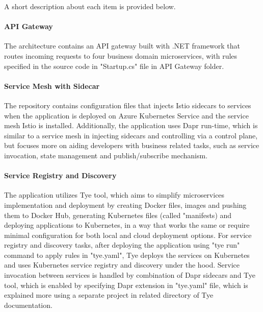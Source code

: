 \documentclass{Configuration_Files/PoliMi3i_thesis}
\begin{document}
A short description about each item is provided below.

\paragraph{API Gateway} The architecture contains an API gateway built with .NET framework that routes incoming requests to four business domain microservices, with rules specified in the source code in "Startup.cs" file in API Gateway folder.

\paragraph{Service Mesh with Sidecar} The repository contains configuration files that injects Istio sidecars to services when the application is deployed on Azure Kubernetes Service and the service mesh Istio is installed.
Additionally, the application uses Dapr run-time, which is similar to a service mesh in injecting sidecars and controlling via a control plane, but focuses more on aiding developers with business related tasks, such as service invocation, state management and publish/subscribe mechanism\footnotemark[97].

\paragraph{Service Registry and Discovery} The application utilizes Tye tool, which aims to simplify microservices implementation and deployment by creating Docker files, images and pushing them to Docker Hub, generating Kubernetes files (called "manifests) and deploying applications to Kubernetes, in a way that works the same or require minimal configuration for both local and cloud deployment options\footnotemark[98].
For service registry and discovery tasks, after deploying the application using "tye run" command to apply rules in "tye.yaml", Tye deploys the services on Kubernetes and uses Kubernetes service registry and discovery under the hood.
Service invocation between services is handled by combination of Dapr sidecars and Tye tool, which is enabled by specifying Dapr extension in "tye.yaml" file, which is explained more using a separate project in related directory of Tye documentation\footnotemark[99].
\end{document}
